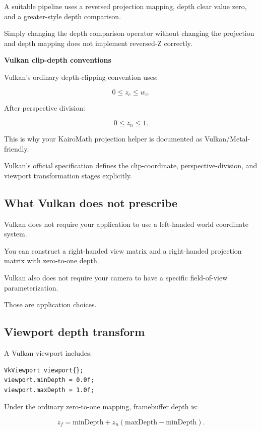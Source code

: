 A suitable pipeline uses a reversed projection mapping, depth clear value zero, and a greater-style depth comparison.

Simply changing the depth comparison operator without changing the projection and depth mapping does not implement reversed-Z correctly.

\textbf{Vulkan clip-depth conventions}

Vulkan's ordinary depth-clipping convention uses:

\[
 \boxed{ 0\le z_c\le w_c }.
\]

After perspective division:

\[
 \boxed{ 0\le z_n\le1 }.
\]

This is why your KairoMath projection helper is documented as Vulkan/Metal-friendly.

Vulkan's official specification defines the clip-coordinate, perspective-division, and viewport transformation stages explicitly. 

\subsection{What Vulkan does not prescribe}\label{02-foundations-ii-ch033-what-vulkan-does-not-prescribe}

Vulkan does not require your application to use a left-handed world coordinate system.

You can construct a right-handed view matrix and a right-handed projection matrix with zero-to-one depth.

Vulkan also does not require your camera to have a specific field-of-view parameterization.

Those are application choices.

\subsection{Viewport depth transform}\label{02-foundations-ii-ch033-viewport-depth-transform}

A Vulkan viewport includes:

\begin{verbatim}
VkViewport viewport{};
viewport.minDepth = 0.0f;
viewport.maxDepth = 1.0f;
\end{verbatim}

Under the ordinary zero-to-one mapping, framebuffer depth is:

\[
 \boxed{ z_f= \text{minDepth} + z_n(\text{maxDepth}-\text{minDepth}) }.
\]

